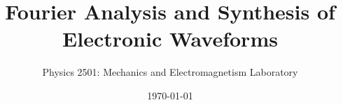 \documentclass{revtex4}
\begin{document}

\title{Fourier Analysis and Synthesis of Electronic Waveforms}


\author{Physics 2501: Mechanics and Electromagnetism Laboratory}


\date{\today}



\setlength{\topmargin}{0in}

\maketitle

\end{document}
